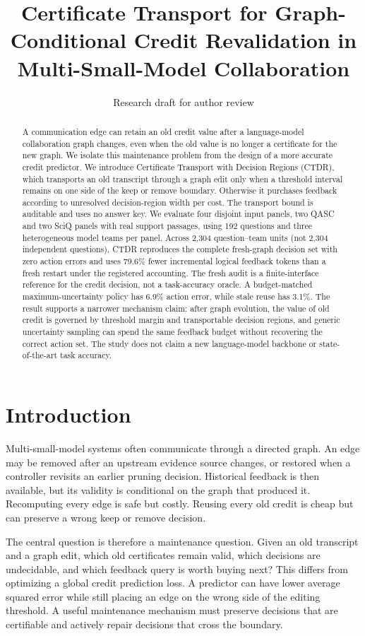 \documentclass[11pt]{article}
\title{Certificate Transport for Graph-Conditional Credit Revalidation in Multi-Small-Model Collaboration}
\author{Research draft for author review}
\newcommand{\ctdr}{\textsc{CTDR}}
\begin{document}
\maketitle
\begin{abstract}
A communication edge can retain an old credit value after a language-model collaboration graph changes, even when the old value is no longer a certificate for the new graph. We isolate this maintenance problem from the design of a more accurate credit predictor. We introduce Certificate Transport with Decision Regions (\ctdr), which transports an old transcript through a graph edit only when a threshold interval remains on one side of the keep or remove boundary. Otherwise it purchases feedback according to unresolved decision-region width per cost. The transport bound is auditable and uses no answer key. We evaluate four disjoint input panels, two QASC and two SciQ panels with real support passages, using 192 questions and three heterogeneous model teams per panel. Across 2,304 question--team units (not 2,304 independent questions), \ctdr{} reproduces the complete fresh-graph decision set with zero action errors and uses 79.6\% fewer incremental logical feedback tokens than a fresh restart under the registered accounting. The fresh audit is a finite-interface reference for the credit decision, not a task-accuracy oracle. A budget-matched maximum-uncertainty policy has 6.9\% action error, while stale reuse has 3.1\%. The result supports a narrower mechanism claim: after graph evolution, the value of old credit is governed by threshold margin and transportable decision regions, and generic uncertainty sampling can spend the same feedback budget without recovering the correct action set. The study does not claim a new language-model backbone or state-of-the-art task accuracy.
\end{abstract}

\section{Introduction}
Multi-small-model systems often communicate through a directed graph. An edge may be removed after an upstream evidence source changes, or restored when a controller revisits an earlier pruning decision. Historical feedback is then available, but its validity is conditional on the graph that produced it. Recomputing every edge is safe but costly. Reusing every old credit is cheap but can preserve a wrong keep or remove decision.

The central question is therefore a maintenance question. Given an old transcript and a graph edit, which old certificates remain valid, which decisions are undecidable, and which feedback query is worth buying next? This differs from optimizing a global credit prediction loss. A predictor can have lower average squared error while still placing an edge on the wrong side of the editing threshold. A useful maintenance mechanism must preserve decisions that are certifiable and actively repair decisions that cross the boundary.
\end{document}
